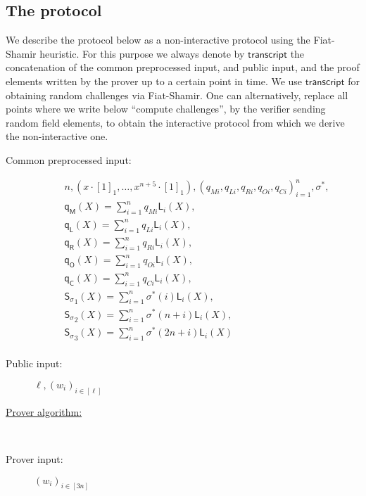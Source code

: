 \documentclass[11pt]{article} %
\newcommand{\vecc}[2]{\ensuremath{(#1)_{#2}}\xspace}
\newcommand{\sigpoly}{\ensuremath{\mathsf{S_{\sigma}}}\xspace}
\newcommand{\lagrangepoly}{\ensuremath{\mathsf{L}}\xspace}
\newcommand{\selmultpoly}{\ensuremath{\mathsf{q_M}}\xspace}
\newcommand{\selleftpoly}{\ensuremath{\mathsf{q_L}}\xspace}
\newcommand{\selrightpoly}{\ensuremath{\mathsf{q_R}}\xspace}
\newcommand{\seloutpoly}{\ensuremath{\mathsf{q_O}}\xspace}
\newcommand{\selconstpoly}{\ensuremath{\mathsf{q_C}}\xspace}
\newcommand{\transcript}{\ensuremath{\mathsf{transcript}}\xspace}
\begin{document}
\subsection{The protocol}

We describe the protocol below as a non-interactive protocol using the Fiat-Shamir heuristic.
For this purpose we always denote by \transcript the concatenation of the common preprocessed input, and public input, and the proof elements written by the prover up to a certain point in time.
We use \transcript for obtaining random challenges via Fiat-Shamir. One can alternatively, replace all points where we write below ``compute challenges'', by the verifier sending random field elements, to obtain the interactive protocol from which we derive the non-interactive one.  
\begin{description}
	\item[Common preprocessed input:]
	$$\begin{array}{l}n, (x \cdot [1]_1, \ldots, {x^{n+5}} \cdot [1]_1), (q_{Mi}, q_{Li}, q_{Ri}, q_{Oi}, q_{Ci})_{i=1}^n, \sigma^*, \\
	\selmultpoly(X) = \sum_{i=1}^nq_{Mi}\lagrangepoly_i(X), \\
	\selleftpoly(X) = \sum_{i=1}^nq_{Li}\lagrangepoly_i(X), \\
	\selrightpoly(X) = \sum_{i=1}^nq_{Ri}\lagrangepoly_i(X), \\ \seloutpoly(X) = \sum_{i=1}^nq_{Oi}\lagrangepoly_i(X), \\ \selconstpoly(X) = \sum_{i=1}^nq_{Ci}\lagrangepoly_i(X), \\
	\sigpoly_1(X) = \sum_{i=1}^n \sigma^*(i) \lagrangepoly_i(X), \\ \sigpoly_2(X) = \sum_{i=1}^n \sigma^*(n + i) \lagrangepoly_i(X), \\ \sigpoly_3(X) = \sum_{i=1}^n \sigma^*(2n + i) \lagrangepoly_i(X)\\ \
\end{array}$$
	\item[Public input:] 	$\ell, \vecc{w_i}{i\in [\ell]}$
	\item[\underline{Prover algorithm:}] \ \\
	\item[Prover input:] $\vecc{w_i}{i\in [3n]}$
	
	\end{description}
	
	
	\noindent
\end{document}

